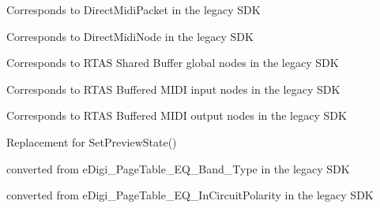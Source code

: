\begin{DoxyRefList}
\item[\label{a00385__porting_notes000003}%
\hypertarget{a00385__porting_notes000003}{}%
Class \hyperlink{a00024}{A\+A\+X\+\_\+\+C\+Midi\+Packet} ]Corresponds to Direct\+Midi\+Packet in the legacy S\+D\+K  
\item[\label{a00385__porting_notes000004}%
\hypertarget{a00385__porting_notes000004}{}%
Class \hyperlink{a00025}{A\+A\+X\+\_\+\+C\+Midi\+Stream} ]Corresponds to Direct\+Midi\+Node in the legacy S\+D\+K  
\item[\label{a00385__porting_notes000029}%
\hypertarget{a00385__porting_notes000029}{}%
global\+Scope$>$ Member \hyperlink{a00206_a5e1dffce35d05990dbbad651702678e4a2be91828f8c1dac20ab5dff136fc1fce}{A\+A\+X\+\_\+e\+M\+I\+D\+I\+Node\+Type\+\_\+\+Global} ]Corresponds to R\+T\+A\+S Shared Buffer global nodes in the legacy S\+D\+K  
\item[\label{a00385__porting_notes000027}%
\hypertarget{a00385__porting_notes000027}{}%
global\+Scope$>$ Member \hyperlink{a00206_a5e1dffce35d05990dbbad651702678e4ae57de2b04978fe2e75f5bdeb034bda44}{A\+A\+X\+\_\+e\+M\+I\+D\+I\+Node\+Type\+\_\+\+Local\+Input} ]Corresponds to R\+T\+A\+S Buffered M\+I\+D\+I input nodes in the legacy S\+D\+K  
\item[\label{a00385__porting_notes000028}%
\hypertarget{a00385__porting_notes000028}{}%
global\+Scope$>$ Member \hyperlink{a00206_a5e1dffce35d05990dbbad651702678e4acc1b5f2109c508b20a65b5e0fdcd643f}{A\+A\+X\+\_\+e\+M\+I\+D\+I\+Node\+Type\+\_\+\+Local\+Output} ]Corresponds to R\+T\+A\+S Buffered M\+I\+D\+I output nodes in the legacy S\+D\+K  
\item[\label{a00385__porting_notes000021}%
\hypertarget{a00385__porting_notes000021}{}%
global\+Scope$>$ Member \hyperlink{a00206_afab5ea2cfd731fc8f163b6caa685406ea8ca3f7d5e93eecf945682f6fc55f5263}{A\+A\+X\+\_\+e\+Notification\+Event\+\_\+\+A\+S\+Preview\+State} ]Replacement for {\ttfamily Set\+Preview\+State()}  
\item[\label{a00385__porting_notes000024}%
\hypertarget{a00385__porting_notes000024}{}%
global\+Scope$>$ Member \hyperlink{a00206_aa169208a2ce713fa021e20deb2eaf608a99ca84cc3dae0f125082d36893a12bcd}{A\+A\+X\+\_\+e\+Page\+Table\+\_\+\+E\+Q\+\_\+\+Band\+\_\+\+Type} ]converted from {\ttfamily e\+Digi\+\_\+\+Page\+Table\+\_\+\+E\+Q\+\_\+\+Band\+\_\+\+Type} in the legacy S\+D\+K 
\item[\label{a00385__porting_notes000025}%
\hypertarget{a00385__porting_notes000025}{}%
global\+Scope$>$ Member \hyperlink{a00206_aa169208a2ce713fa021e20deb2eaf608ac5a06a293b7706191d3371813c47e999}{A\+A\+X\+\_\+e\+Page\+Table\+\_\+\+E\+Q\+\_\+\+In\+Circuit\+Polarity} ]converted from {\ttfamily e\+Digi\+\_\+\+Page\+Table\+\_\+\+E\+Q\+\_\+\+In\+Circuit\+Polarity} in the legacy S\+D\+K 

\end{DoxyRefList}
